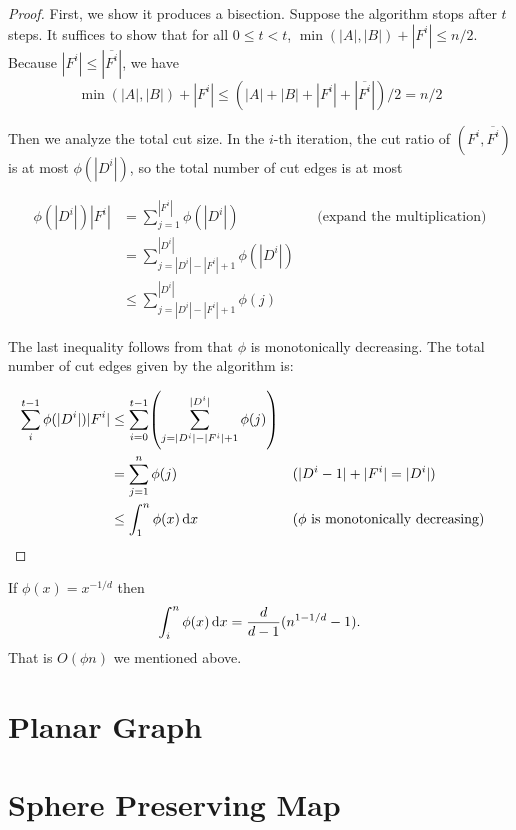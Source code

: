 \documentclass[11pt]{article}
\begin{document}
\begin{proof}
First, we show it produces a bisection. Suppose the algorithm stops after $t$ steps. It suffices to show that for all $0 \leq t < t$, $\min(|A|, |B|) + |F^i| \leq n/2$. Because $|F^i| \leq |\overline{F^i}|$, we have 
$$
\min(|A|, |B|) + |F^i| \leq (|A| + |B| + |F^i| + |\overline{F^i}|)/2 = n/2
$$

Then we analyze the total cut size. In the $i$-th iteration, the cut ratio of $(F^i, \overline{F^i})$ is at most $\phi(|D^i|)$, so the total number of cut edges is at most

\begin{align*}
    \phi(|D^i|)|F^i| &= \sum_{j=1}^{|F^i|} \phi(|D^i|) && \text{(expand the multiplication)}\\
    &= \sum_{j=|D^i| - |F^i| + 1}^{|D^i|} \phi(|D^i|)\\
    &\leq \sum_{j=|D^i| - |F^i| + 1}^{|D^i|} \phi(j)
\end{align*}

The last inequality follows from that $\phi$ is monotonically decreasing. The total number of cut edges given by the algorithm is:

\begin{align*}
\sum_i^{t-1} \phi(|D^i|) |F^i| &\leq \sum_{i=0}^{t-1} \left( \sum_{j=|D^i| - |F^i| + 1}^{|D^i|} \phi(j) \right) \\
&= \sum_{j=1}^n \phi(j) && \text{($|D^i-1| + |F^i| = |D^i|$)} \\
&\leq \int_1^n \phi(x) \dif x && \text{($\phi$ is monotonically decreasing)}
\end{align*}

\end{proof}

\begin{remark}
If $\phi(x)=x^{-1/d}$ then 
$$
\int_i^n \phi(x) \dif x = \frac{d}{d-1} (n^{1-1/d} -1).
$$
That is $O(\phi n)$ we mentioned above.
\end{remark}

\section{Planar Graph}\label{planar}

\section{Sphere Preserving Map}\label{planar}




\end{document}
